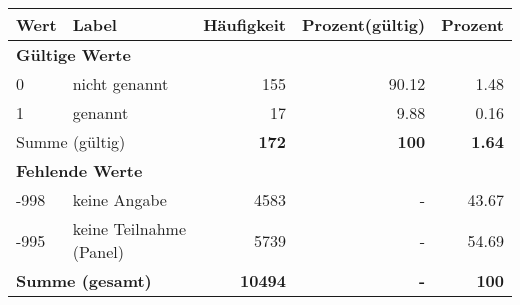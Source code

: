      \begin{longtable}{lXrrr}
     \toprule
     \textbf{Wert} & \textbf{Label} & \textbf{Häufigkeit} & \textbf{Prozent(gültig)} & \textbf{Prozent} \\
     \endhead
     \midrule
     \multicolumn{5}{l}{\textbf{Gültige Werte}}\\

     0 &
     \multicolumn{1}{X}{ nicht genannt   } &


       \num{155} &
       \num[round-mode=places,round-precision=2]{90.12} &
         \num[round-mode=places,round-precision=2]{1.48} \\

     1 &
     \multicolumn{1}{X}{ genannt   } &


       \num{17} &
       \num[round-mode=places,round-precision=2]{9.88} &
         \num[round-mode=places,round-precision=2]{0.16} \\
     \midrule
     \multicolumn{2}{l}{Summe (gültig)} &
       \textbf{\num{172}} &
     \textbf{\num{100}} &
       \textbf{\num[round-mode=places,round-precision=2]{1.64}} \\
     \multicolumn{5}{l}{\textbf{Fehlende Werte}}\\
       -998 &
       keine Angabe &
         \num{4583} &
        - &
         \num[round-mode=places,round-precision=2]{43.67} \\
       -995 &
       keine Teilnahme (Panel) &
         \num{5739} &
        - &
         \num[round-mode=places,round-precision=2]{54.69} \\
     \midrule
     \multicolumn{2}{l}{\textbf{Summe (gesamt)}} &
          \textbf{\num{10494}} &
        \textbf{-} &
        \textbf{\num{100}} \\
     \bottomrule
     \end{longtable}
     
